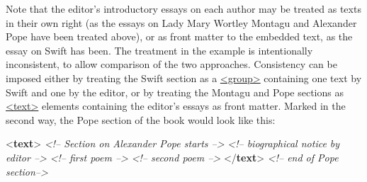 Note that the editor's introductory essays on each author may be treated as texts in their own right (as the essays on Lady Mary Wortley Montagu and Alexander Pope have been treated above), or as front matter to the embedded text, as the essay on Swift has been. The treatment in the example is intentionally inconsistent, to allow comparison of the two approaches. Consistency can be imposed either by treating the Swift section as a \hyperref[TEI.group]{<group>} containing one text by Swift and one by the editor, or by treating the Montagu and Pope sections as \hyperref[TEI.text]{<text>} elements containing the editor's essays as front matter. Marked in the second way, the Pope section of the book would look like this: \par\bgroup{}\exampleFont \begin{shaded}\noindent\mbox{}{<\textbf{text}>}\mbox{}\newline 
\textit{<!-- Section on Alexander Pope starts -->}\mbox{}\newline 
{}\mbox{}\newline 
\textit{<!-- biographical notice by editor -->}\mbox{}\newline 
{}\mbox{}\newline 
{}\mbox{}\newline 
\hspace*{1em}\mbox{}\newline 
\textit{<!-- first poem -->}\mbox{}\newline 
\hspace*{1em}\mbox{}\newline 
\hspace*{1em}\mbox{}\newline 
\textit{<!-- second poem -->}\mbox{}\newline 
\hspace*{1em}\mbox{}\newline 
{}\mbox{}\newline 
{</\textbf{text}>}\mbox{}\newline 
\textit{<!-- end of Pope section-->}\end{shaded}\egroup\par \par
